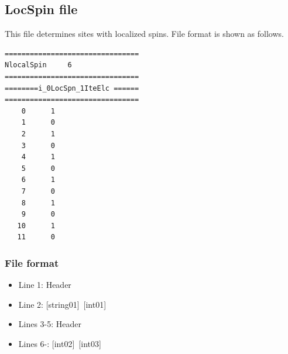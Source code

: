 \subsection{LocSpin file}
\label{Subsec:locspn}
This file determines sites with localized spins. File format is shown as follows.\\
\begin{minipage}{10cm}
\begin{screen}
\begin{verbatim}
================================ 
NlocalSpin     6  
================================ 
========i_0LocSpn_1IteElc ====== 
================================ 
    0      1
    1      0
    2      1
    3      0
    4      1
    5      0
    6      1
    7      0
    8      1
    9      0
   10      1
   11      0
\end{verbatim}
\end{screen}
\end{minipage}


\subsubsection{File format}
\begin{itemize}
   \item  Line 1:  Header
   \item  Line 2:   [string01]~[int01]
   \item  Lines 3-5:  Header
   \item  Lines 6-:  [int02]~[int03]
  \end{itemize}
